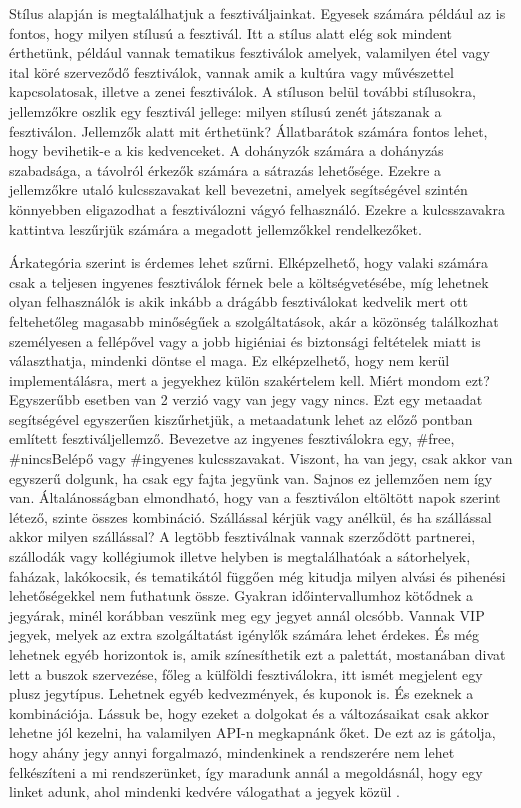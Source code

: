 Stílus alapján is megtalálhatjuk a fesztiváljainkat. Egyesek számára például az is fontos, hogy milyen stílusú a fesztivál. Itt a stílus alatt elég sok mindent érthetünk, például vannak tematikus fesztiválok amelyek, valamilyen étel vagy ital köré szerveződő fesztiválok, vannak amik a kultúra vagy művészettel kapcsolatosak, illetve a zenei fesztiválok. A stíluson belül további stílusokra, jellemzőkre oszlik egy fesztivál jellege:  milyen stílusú zenét játszanak a fesztiválon. Jellemzők alatt mit érthetünk? Állatbarátok számára fontos lehet, hogy bevihetik-e  a kis kedvenceket. A dohányzók számára a dohányzás szabadsága, a távolról érkezők számára  a sátrazás lehetősége. Ezekre a jellemzőkre utaló kulcsszavakat kell bevezetni, amelyek segítségével szintén könnyebben eligazodhat a fesztiválozni vágyó felhasználó. Ezekre a kulcsszavakra kattintva leszűrjük számára a megadott jellemzőkkel rendelkezőket.

Árkategória szerint is érdemes lehet szűrni. Elképzelhető, hogy valaki számára csak a teljesen ingyenes fesztiválok férnek bele a költségvetésébe, míg lehetnek olyan felhasználók is akik inkább a drágább fesztiválokat kedvelik mert ott feltehetőleg magasabb minőségűek a szolgáltatások, akár a közönség találkozhat személyesen a fellépővel vagy a jobb higiéniai és biztonsági feltételek miatt is választhatja, mindenki döntse el maga. Ez elképzelhető, hogy nem kerül implementálásra, mert a jegyekhez külön szakértelem kell. Miért mondom ezt? Egyszerűbb esetben van 2 verzió vagy van jegy vagy nincs. Ezt egy metaadat segítségével egyszerűen kiszűrhetjük, a metaadatunk lehet az előző pontban említett fesztiváljellemző. Bevezetve az ingyenes fesztiválokra egy, \#free, \#nincsBelépő vagy \#ingyenes kulcsszavakat. Viszont, ha van jegy, csak akkor van egyszerű dolgunk, ha csak egy fajta jegyünk van. Sajnos ez jellemzően nem így van. Általánosságban elmondható, hogy van a fesztiválon eltöltött napok szerint létező, szinte összes kombináció. Szállással kérjük vagy anélkül, és ha szállással akkor milyen szállással? A legtöbb fesztiválnak vannak szerződött partnerei, szállodák vagy kollégiumok illetve helyben is megtalálhatóak a sátorhelyek, faházak, lakókocsik, és tematikától függően még kitudja milyen alvási és pihenési lehetőségekkel nem futhatunk össze. Gyakran időintervallumhoz kötődnek a jegyárak, minél korábban veszünk meg egy jegyet annál olcsóbb. Vannak VIP jegyek, melyek az extra szolgáltatást igénylők számára lehet érdekes. És még lehetnek egyéb horizontok is, amik színesíthetik ezt a palettát, mostanában divat lett a buszok szervezése, főleg a  külföldi fesztiválokra, itt ismét megjelent egy plusz jegytípus. Lehetnek egyéb kedvezmények, és kuponok is. És ezeknek a kombinációja. Lássuk be, hogy ezeket a dolgokat és a változásaikat csak akkor lehetne jól kezelni, ha valamilyen API-n megkapnánk őket. De ezt az is gátolja, hogy ahány jegy annyi forgalmazó, mindenkinek a rendszerére nem lehet felkészíteni a mi rendszerünket, így maradunk annál a megoldásnál, hogy egy linket adunk, ahol mindenki kedvére válogathat a jegyek közül \cite{22}.

